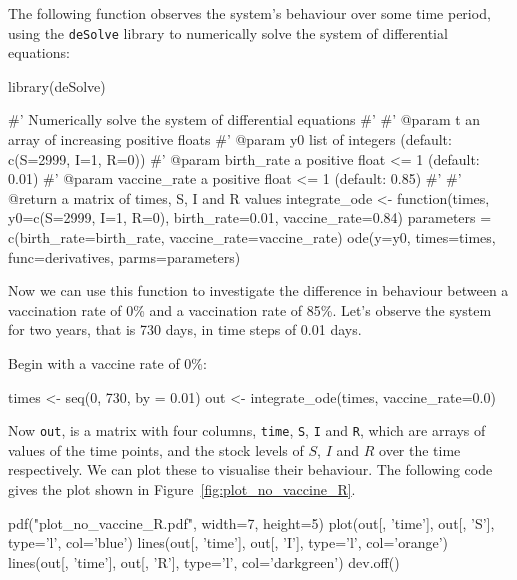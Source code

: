 The following function observes the system's behaviour over some time period,
using the \texttt{deSolve} library to numerically solve the system of
differential equations:

\begin{Rin}
library(deSolve)

#' Numerically solve the system of differential equations
#'
#' @param t an array of increasing positive floats
#' @param y0 list of integers (default: c(S=2999, I=1, R=0))
#' @param birth_rate a positive float <= 1 (default: 0.01)
#' @param vaccine_rate a positive float <= 1 (default: 0.85)
#'
#' @return a matrix of times, S, I and R values
integrate_ode <- function(times,
                          y0=c(S=2999, I=1, R=0),
                          birth_rate=0.01,
                          vaccine_rate=0.84){
  parameters = c(birth_rate=birth_rate,
                 vaccine_rate=vaccine_rate)
  ode(y=y0, times=times, func=derivatives, parms=parameters)
}
\end{Rin}

Now we can use this function to investigate the difference in behaviour between
a vaccination rate of 0\% and a vaccination rate of 85\%. Let's observe the
system for two years, that is 730 days, in time steps of 0.01 days.

Begin with a vaccine rate of 0\%:

\begin{Rin}
times <- seq(0, 730, by = 0.01)
out <- integrate_ode(times, vaccine_rate=0.0)
\end{Rin}

Now \texttt{out}, is a matrix with four columns,  \texttt{time},
\texttt{S}, \texttt{I} and \texttt{R}, which are arrays of
values of the time points, and the stock levels of $S$, $I$ and $R$ over the
time respectively.
We can plot these to visualise their behaviour.
The following code gives the plot shown in Figure~\ref{fig:plot_no_vaccine_R}.


\begin{Rin}
pdf("plot_no_vaccine_R.pdf", width=7, height=5) 
plot(out[, 'time'], out[, 'S'], type='l', col='blue')
lines(out[, 'time'], out[, 'I'], type='l', col='orange')
lines(out[, 'time'], out[, 'R'], type='l', col='darkgreen')
dev.off()
\end{Rin}


